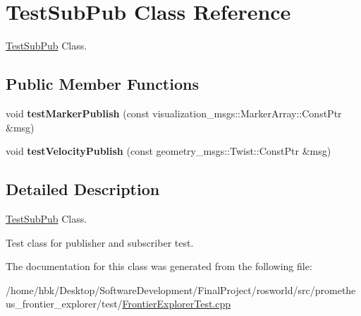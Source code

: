 \hypertarget{classTestSubPub}{}\section{Test\+Sub\+Pub Class Reference}
\label{classTestSubPub}


\hyperlink{classTestSubPub}{Test\+Sub\+Pub} Class.  


\subsection*{Public Member Functions}
\begin{DoxyCompactItemize}
\item 
void {\bfseries test\+Marker\+Publish} (const visualization\+\_\+msgs\+::\+Marker\+Array\+::\+Const\+Ptr \&msg)\hypertarget{classTestSubPub_aa6c1d296085874a313c62ee6c7c4f8ce}{}\label{classTestSubPub_aa6c1d296085874a313c62ee6c7c4f8ce}

\item 
void {\bfseries test\+Velocity\+Publish} (const geometry\+\_\+msgs\+::\+Twist\+::\+Const\+Ptr \&msg)\hypertarget{classTestSubPub_a854cfe325476ea421a169615ce12fce1}{}\label{classTestSubPub_a854cfe325476ea421a169615ce12fce1}

\end{DoxyCompactItemize}


\subsection{Detailed Description}
\hyperlink{classTestSubPub}{Test\+Sub\+Pub} Class. 

Test class for publisher and subscriber test. 

The documentation for this class was generated from the following file\+:\begin{DoxyCompactItemize}
\item 
/home/hbk/\+Desktop/\+Software\+Development/\+Final\+Project/rosworld/src/prometheus\+\_\+frontier\+\_\+explorer/test/\hyperlink{FrontierExplorerTest_8cpp}{Frontier\+Explorer\+Test.\+cpp}\end{DoxyCompactItemize}
